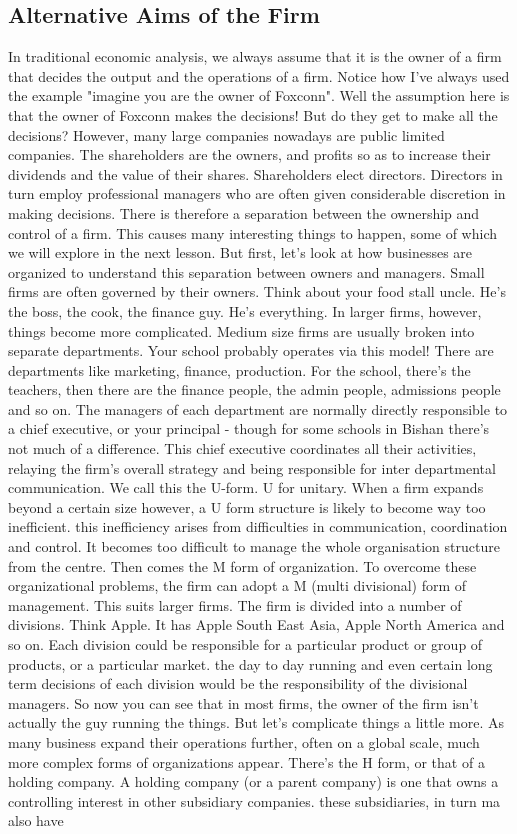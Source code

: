 \subsection{Alternative Aims of the Firm}
 In traditional economic analysis, we always assume that it is the owner of a firm that decides the output and the operations of a firm. Notice how I've always used the example "imagine you are the owner of Foxconn". Well the assumption here is that the owner of Foxconn makes the decisions! But do they get to make all the decisions? However, many large companies nowadays are public limited companies. The shareholders are the owners, and profits so as to increase their dividends and the value of their shares. Shareholders elect directors. Directors in turn employ professional managers who are often given considerable discretion in making decisions. There is therefore a separation between the ownership and control of a firm. This causes many interesting things to happen, some of which we will explore in the next lesson. But first, let's look at how businesses are organized to understand this separation between owners and managers. Small firms are often governed by their owners. Think about your food stall uncle. He's the boss, the cook, the finance guy. He's everything. In larger firms, however, things become more complicated. Medium size firms are usually broken into separate departments. Your school probably operates via this model! There are departments like marketing, finance, production. For the school, there's the teachers, then there are the finance people, the admin people, admissions people and so on. The managers of each department are normally directly responsible to a chief executive, or your principal - though for some schools in Bishan there's not much of a difference. This chief executive coordinates all their activities, relaying the firm's overall strategy and being responsible for inter departmental communication. We call this the U-form. U for unitary. When a firm expands beyond a certain size however, a U form structure is likely to become way too inefficient. this inefficiency arises from difficulties in communication, coordination and control. It becomes too difficult to manage the whole organisation structure from the centre. Then comes the M form of organization. To overcome these organizational problems, the firm can adopt a M (multi divisional) form of management. This suits larger firms. The firm is divided into a number of divisions. Think Apple. It has Apple South East Asia, Apple North America and so on. Each division could be responsible for a particular product or group of products, or a particular market. the day to day running and even certain long term decisions of each division would be the responsibility of the divisional managers. So now you can see that in most firms, the owner of the firm isn't actually the guy running the things. But let's complicate things a little more. As many business expand their operations further, often on a global scale, much more complex forms of organizations appear. There's the H form, or that of a holding company. A holding company (or a parent company) is one that owns a controlling interest in other subsidiary companies. these subsidiaries, in turn ma also have 